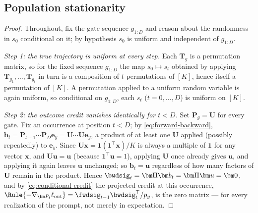 \subsection{Population stationarity}
\label{app:population-stationarity}
\begin{proof}
Throughout, fix the gate sequence $g_{1:D}$ and reason about the randomness
in $s_0$ conditional on it; by hypothesis $s_0$ is uniform and independent
of $g_{1:D}$.

\emph{Step 1: the true trajectory is uniform at every step.} Each $\bm T_g$
is a permutation matrix, so for the fixed sequence $g_{1:D}$ the map
$s_0\mapsto s_t$ obtained by applying $\bm T_{g_1},\ldots,\bm T_{g_t}$ in
turn is a composition of $t$ permutations of $[K]$, hence itself a
permutation of $[K]$. A permutation applied to a uniform random variable is
again uniform, so conditional on $g_{1:D}$, each $s_t$ ($t=0,\ldots,D$) is
uniform on $[K]$.

\emph{Step 2: the outcome credit vanishes identically for $t<D$.} Set
$\bm P_g=\bm U$ for every gate. Fix an occurrence at position $t<D$; by
\cref{eq:forward-backward}, $\bm b_t=\bm P_{t+1}\cdots\bm P_D\bm e_y=\bm U\cdots\bm U\bm e_y$,
a product of at least one $\bm U$ applied (possibly repeatedly) to $\bm e_y$.
Since $\bm U\bm x=\mathbf1(\mathbf1^\top\bm x)/K$ is always a multiple of
$\mathbf1$ for any vector $\bm x$, and $\bm U\bm u=\bm u$ (because
$\mathbf1^\top\bm u=1$), applying $\bm U$ once already gives $\bm u$, and
applying it again leaves $\bm u$ unchanged; so $\bm b_t=\bm u$ regardless of
how many factors of $\bm U$ remain in the product. Hence
$\bwdsig_t=\bm\Pi\bm b_t=\bm\Pi\bm u=\bm0$, and by \cref{eq:conditional-credit}
the projected credit at this occurrence,
$\Rule{-\nabla_{\bm P_t}\ell_{\rm out}}=\fwdsig_{t-1}\bwdsig_t^\top/p_y$, is
the zero matrix --- for every realization of the prompt, not merely in
expectation.


\end{proof}
